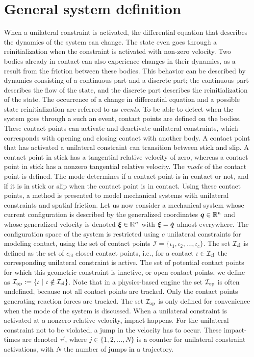 \documentclass[../DC2017114Bouma.tex]{subfiles}
\begin{document}
\section{General system definition}
When a unilateral constraint is activated, the differential equation that describes the dynamics of the system can change. The state even goes through a reinitialization when the constraint is activated with non-zero velocity. Two bodies already in contact can also experience changes in their dynamics, as a result from the friction between these bodies. This behavior can be described by dynamics consisting of a continuous part and a discrete part; the continuous part describes the flow of the state, and the discrete part describes the reinitialization of the state. The occurrence of a change in differential equation and a possible state reinitialization are referred to as \textit{events}. To be able to detect when the system goes through a such an event, contact points are defined on the bodies. These contact points can activate and deactivate unilateral constraints, which corresponds with opening and closing contact with another body. A contact point that has activated a unilateral constraint can transition between stick and slip. A contact point in stick has a tangential relative velocity of zero, whereas a contact point in stick has a nonzero tangential relative velocity. The \textit{mode} of the contact point is defined. The mode determines if a contact point is in contact or not, and if it is in stick or slip when the contact point is in contact. Using these contact points, a method is presented to model mechanical systems with unilateral constraints and spatial friction. Let us now consider a mechanical system whose current configuration is described by the generalized coordinates ${\boldsymbol{q}}\in\mathbb{R}^n$ and whose generalized velocity is denoted $\boldsymbol{\xi}\in\mathbb{R}^n$ with $\boldsymbol{\xi}=\dot{{\boldsymbol{q}}}$ almost everywhere. The configuration space of the system is restricted using $c$ unilateral constraints for modeling contact, using the set of contact points $\mathcal{I}=\{\iota_1,\iota_2,\dots,\iota_c\}$. The set $\mathcal{I}_{\text{cl}}$ is defined as the set of $c_{\text{cl}}$ closed contact points, i.e., for a contact $\iota\in\mathcal{I}_{\text{cl}}$ the corresponding unilateral constraint is active. The set of potential contact points for which this geometric constraint is inactive, or open contact points, we define as $\Ic_{\text{op}} := \{\iota\ |\ \iota\notin\Ic_{\text{cl}}\}$. Note that in a physics-based engine the set $\mathcal{I}_{\text{op}}$ is often undefined, because not all contact points are tracked. Only the contact points generating reaction forces are tracked. The set $\mathcal{I}_{\text{op}}$ is only defined for convenience when the mode of the system is discussed. When a unilateral constraint is activated at a nonzero relative velocity, impact happens. For the unilateral constraint not to be violated, a jump in the velocity has to occur. These impact-times are denoted $\tau^j$, where $j\in \{1,2,\dots,N\}$ is a counter for unilateral constraint activations, with $N$ the number of jumps in a trajectory.
\end{document}
